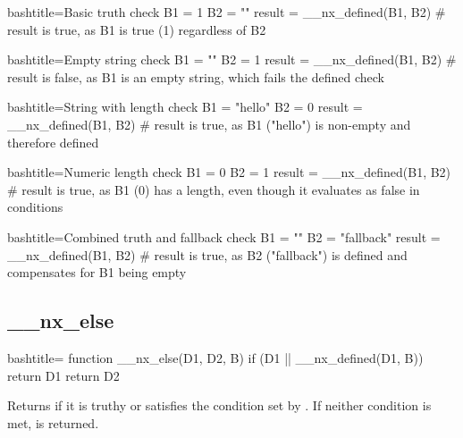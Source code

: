 \begin{NexCodeBox}{bash}{title={Basic truth check}}
	B1 = 1
	B2 = ""
	result = __nx_defined(B1, B2)
	# result is true, as B1 is true (1) regardless of B2
\end{NexCodeBox}

\begin{NexCodeBox}{bash}{title={Empty string check}}
	B1 = ""
	B2 = 1
	result = __nx_defined(B1, B2)
	# result is false, as B1 is an empty string, which fails the defined check
\end{NexCodeBox}

\begin{NexCodeBox}{bash}{title={String with length check}}
	B1 = "hello"
	B2 = 0
	result = __nx_defined(B1, B2)
	# result is true, as B1 ("hello") is non-empty and therefore defined
\end{NexCodeBox}

\begin{NexCodeBox}{bash}{title={Numeric length check}}
	B1 = 0
	B2 = 1
	result = __nx_defined(B1, B2)
	# result is true, as B1 (0) has a length, even though it evaluates as false in conditions
\end{NexCodeBox}

\begin{NexCodeBox}{bash}{title={Combined truth and fallback check}}
	B1 = ""
	B2 = "fallback"
	result = __nx_defined(B1, B2)
	# result is true, as B2 ("fallback") is defined and compensates for B1 being empty
\end{NexCodeBox}

\newpage
\subsection{__nx_else}
\label{__nx_else}
\begin{NexCodeBox}{bash}{title={}}
function __nx_else(D1, D2, B) {
	if (D1 || __nx_defined(D1, B))
		return D1
	return D2
}
\end{NexCodeBox}

\begin{NexMainBox}
	\begin{NexMainBox}
		Returns  if it is truthy or satisfies the condition set by . If neither condition is met,  is returned.
	\end{NexMainBox}
	\begin{NexMainBox}
		\begin{NexListDark}
		\end{NexListDark}
	\end{NexMainBox}
\end{NexMainBox}

